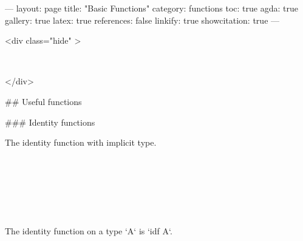 ---
layout: page
title: "Basic Functions"
category: functions
toc: true
agda: true
gallery: true
latex: true
references: false
linkify: true
showcitation: true
---

<div class="hide" >
\begin{code}%
\>[0]\AgdaSymbol{\{-\#}\AgdaSpace{}%
\AgdaSpace{}%
\AgdaSpace{}%
\AgdaSymbol{\#-\}}\<%
\\
\>[0]\AgdaSpace{}%
\AgdaSpace{}%
\AgdaSpace{}%
\<%
\end{code}
</div>

## Useful functions

### Identity functions

The identity function with implicit type.
\begin{code}%
\>[0]\<%
\\
\>[0][@{}l@{\AgdaIndent{0}}]%
\>[2]\AgdaSymbol{:}\AgdaSpace{}%
\AgdaSpace{}%
\AgdaSymbol{\{}\AgdaSpace{}%
\AgdaSymbol{:}\AgdaSpace{}%
\AgdaSpace{}%
\AgdaSymbol{\}}\<%
\\
%
\>[2]\AgdaComment{----------------}\<%
\\
%
\>[2]\AgdaSpace{}%
\AgdaSpace{}%
\AgdaSpace{}%
\<%
\\
%
\\[\AgdaEmptyExtraSkip]%
\>[0]\AgdaSpace{}%
\AgdaSymbol{=}\AgdaSpace{}%
\AgdaSpace{}%
\AgdaSpace{}%
\AgdaSpace{}%
\<%
\end{code}

The identity function on a type `A` is `idf A`.

\begin{code}%
\>[0]\<%
\\
\>[0][@{}l@{\AgdaIndent{0}}]%
\>[2]\AgdaSymbol{:}\AgdaSpace{}%
\AgdaSymbol{(}\AgdaSpace{}%
\AgdaSymbol{:}\AgdaSpace{}%
\AgdaSpace{}%
\AgdaSymbol{)}\<%
\\
%
\>[2]\AgdaComment{---------------}\<%
\\
%
\>[2]\AgdaSpace{}%
\AgdaSymbol{(}\AgdaSpace{}%
\AgdaSpace{}%
\AgdaSymbol{)}\<%
\\
%
\\[\AgdaEmptyExtraSkip]%
\>[0]\AgdaSpace{}%
\AgdaSpace{}%
\AgdaSymbol{=}\AgdaSpace{}%
\AgdaSpace{}%
\AgdaSpace{}%
\AgdaSpace{}%
\<%
\end{code}



